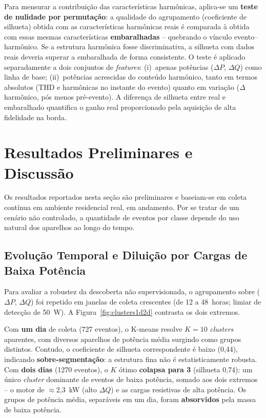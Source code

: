 \documentclass[12pt]{article}
\begin{document}
Para mensurar a contribui\c{c}\~ao das caracter\'isticas harm\^onicas, aplica-se
um \textbf{teste de nulidade por permuta\c{c}\~ao}: a qualidade do agrupamento
(coeficiente de silhueta) obtida com as caracter\'isticas harm\^onicas reais \'e
comparada \`a obtida com essas mesmas caracter\'isticas \textbf{embaralhadas} --
quebrando o v\'inculo evento--harm\^onico. Se a estrutura harm\^onica fosse
discriminativa, a silhueta com dados reais deveria superar a embaralhada de forma
consistente. O teste \'e aplicado separadamente a dois conjuntos de
\textit{features}: (i)~apenas pot\^encias ($\Delta P$, $\Delta Q$) como linha de
base; (ii)~pot\^encias acrescidas do conte\'udo harm\^onico, tanto em termos
absolutos (THD e harm\^onicas no instante do evento) quanto em varia\c{c}\~ao
($\Delta$harm\^onico, p\'os menos pr\'e-evento). A diferen\c{c}a de silhueta entre
real e embaralhado quantifica o ganho real proporcionado pela aquisi\c{c}\~ao de
alta fidelidade na borda.


\section{Resultados Preliminares e Discuss\~ao}

Os resultados reportados nesta se\c{c}\~ao s\~ao preliminares e baseiam-se em
coleta cont\'inua em ambiente residencial real, em andamento. Por se tratar de um
cen\'ario n\~ao controlado, a quantidade de eventos por classe depende do uso
natural dos aparelhos ao longo do tempo.

\subsection{Evolu\c{c}\~ao Temporal e Dilui\c{c}\~ao por Cargas de Baixa
Pot\^encia}

Para avaliar a robustez da descoberta n\~ao supervisionada, o agrupamento sobre
($\Delta P$, $\Delta Q$) foi repetido em janelas de coleta crescentes (de 12 a
48~horas; limiar de detec\c{c}\~ao de 50~W). A Figura~\ref{fig:clusters1d2d}
contrasta os dois extremos.

Com \textbf{um dia} de coleta (727 eventos), o K-means resolve $K=10$
\textit{clusters} aparentes, com diversos aparelhos de pot\^encia m\'edia surgindo
como grupos distintos. Contudo, o coeficiente de silhueta correspondente \'e baixo
(0{,}44), indicando \textbf{sobre-segmenta\c{c}\~ao}: a estrutura fina n\~ao \'e
estatisticamente robusta. Com \textbf{dois dias} (1270 eventos), o $K$ \'otimo
\textbf{colapsa para 3} (silhueta 0{,}74): um \'unico \textit{cluster} dominante de
eventos de baixa pot\^encia, somado aos dois extremos -- o motor de
$\approx$2{,}3~kW (alto $\Delta Q$) e as cargas resistivas de alta pot\^encia. Os
grupos de pot\^encia m\'edia, separ\'aveis em um dia, foram \textbf{absorvidos}
pela massa de baixa pot\^encia.
\end{document}
